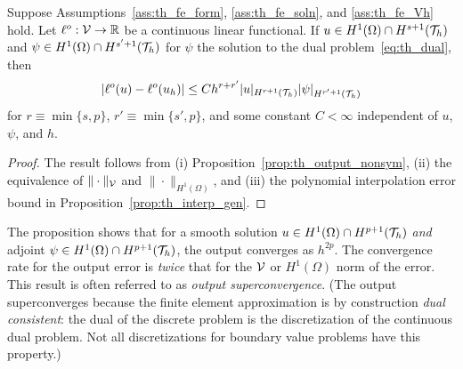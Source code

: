 \begin{proposition}
   Suppose Assumptions~\ref{ass:th_fe_form}, \ref{ass:th_fe_soln}, and \ref{ass:th_fe_Vh} hold. Let $\ell^o: \mathcal{V} \to \mathbb{R}$ be a continuous linear functional.  If $u \in H^1(\Omega) \cap H^{s+1}(\mathcal{T}_h)$ and $\psi \in H^1(\Omega) \cap H^{s'+1}(\mathcal{T}_h)$ for $\psi$ the solution to the dual problem~\ref{eq:th_dual}, then
  \begin{equation*}
    | \ell^o(u) - \ell^o(u_h) | \leq C h^{r + r'} | u |_{H^{r+1}(\mathcal{T}_h)} | \psi |_{H^{r'+1}(\mathcal{T}_h)}
  \end{equation*}
  for $r \equiv \min\{ s,p \}$, $r' \equiv \min\{ s',p \}$, and some constant $C < \infty$ independent of $u$, $\psi$, and $h$.
  \begin{proof}
    The result follows from (i) Proposition~\ref{prop:th_output_nonsym},  (ii) the equivalence of $\|\cdot\|_{\mathcal{V}}$ and $\| \cdot \|_{H^1(\Omega)}$, and (iii) the polynomial interpolation error bound in Proposition~\ref{prop:th_interp_gen}.
  \end{proof}
\end{proposition}
The proposition shows that for a smooth solution $u \in H^1(\Omega) \cap H^{p+1}(\mathcal{T}_h)$ \emph{and} adjoint $\psi \in H^1(\Omega) \cap H^{p+1}(\mathcal{T}_h)$, the output converges as $h^{2p}$. The convergence rate for the output error is \emph{twice} that for the $\mathcal{V}$ or $H^1(\Omega)$ norm of the error.  This result is often referred to as \emph{output superconvergence}.  (The output superconverges because the finite element approximation is by construction \emph{dual consistent}: the dual of the discrete problem is the discretization of the continuous dual problem.  Not all discretizations for boundary value problems have this property.)


